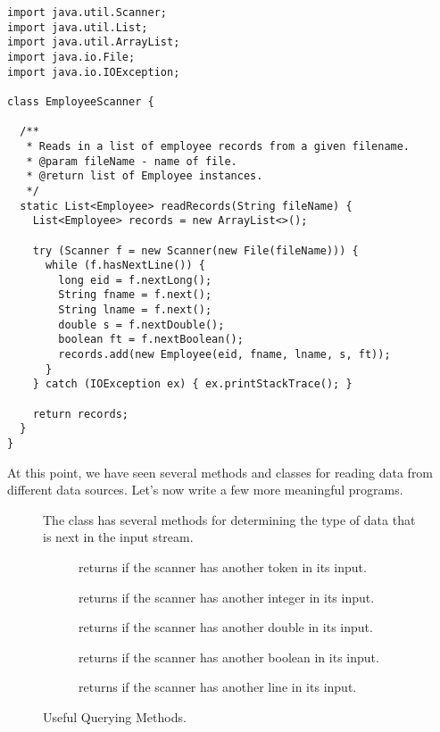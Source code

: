 \begin{lstlisting}[language=MyJava]
import java.util.Scanner;
import java.util.List;
import java.util.ArrayList;
import java.io.File;
import java.io.IOException;

class EmployeeScanner {

  /**
   * Reads in a list of employee records from a given filename.
   * @param fileName - name of file.
   * @return list of Employee instances.
   */
  static List<Employee> readRecords(String fileName) {
    List<Employee> records = new ArrayList<>();

    try (Scanner f = new Scanner(new File(fileName))) {
      while (f.hasNextLine()) {
        long eid = f.nextLong();
        String fname = f.next();
        String lname = f.next();
        double s = f.nextDouble();
        boolean ft = f.nextBoolean();
        records.add(new Employee(eid, fname, lname, s, ft));
      }
    } catch (IOException ex) { ex.printStackTrace(); }

    return records;
  }
}
\end{lstlisting}

At this point, we have seen several methods and classes for reading data from different data sources. 
Let's now write a few more meaningful programs.

\begin{figure}[tp]
  \small
  \begin{tcolorbox}[title=Scanner Querying Methods]
    The  class has several methods for determining the type of data that is next in the input stream.
    \vspace{2ex}
  \begin{description}
    \item [] returns  if the scanner has another token in its input.
    \item [] returns  if the scanner has another integer in its input.
    \item [] returns  if the scanner has another double in its input.
    \item [] returns  if the scanner has another boolean in its input.
    \item [] returns  if the scanner has another line in its input.
  \end{description}
\end{tcolorbox}
\caption{Useful  Querying Methods.}
\label{fig:scq}
\end{figure}

